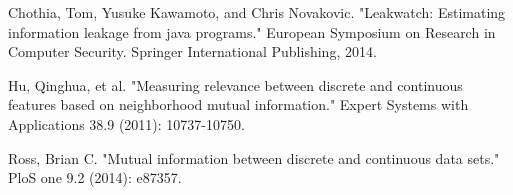 \documentclass{article}
\begin{document}
\begin{thebibliography}{9}

 
Chothia, Tom, Yusuke Kawamoto, and Chris Novakovic. 
"Leakwatch: Estimating information leakage from java programs." 
European Symposium on Research in Computer Security. Springer International Publishing, 2014.

Hu, Qinghua, et al. 
"Measuring relevance between discrete and continuous features based on neighborhood mutual information."
 Expert Systems with Applications 38.9 (2011): 10737-10750.
 
 Ross, Brian C. 
 "Mutual information between discrete and continuous data sets."
  PloS one 9.2 (2014): e87357.

 
 \end{thebibliography}
 
\end{document}
